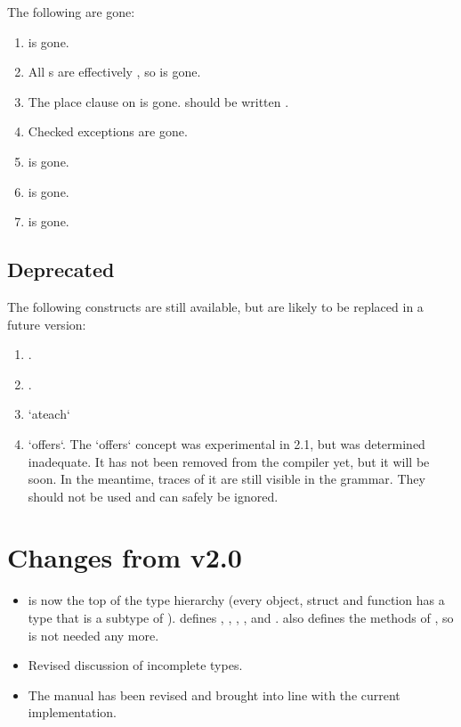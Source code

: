 The following are gone: 

\begin{enumerate}
\item {} is gone.
\item All s are effectively , so  is gone.
\item The place clause on  is gone.   should be
      written .
\item Checked exceptions are gone.
\item {} is gone.
\item {} is gone.
\item {} is gone.

\end{enumerate}

\subsection{Deprecated}

The following constructs are still available, but are likely to be replaced in
a future version: 


\begin{enumerate}
\item {}.
\item {}.
\item \xcd`ateach`
\item \xcd`offers`.    The \xcd`offers` concept was experimental
      in 2.1, but was determined inadequate.  It has not been removed from the
      compiler yet, but it will be soon.  In the meantime, traces of it are
      still visible in the grammar.  They should not be used and can safely be ignored.
\end{enumerate}

\section{Changes from \Xten{} v2.0}

\begin{itemize}
\item {} is now the top of the type hierarchy (every object,
  struct and function has a type that is a subtype of
  ).  defines , , ,
  ,  and .  also defines the methods
  of , so  is not needed any more.
\item Revised discussion of incomplete types.
\item The manual has been revised and brought into line with the current implementation. 
\end{itemize}
